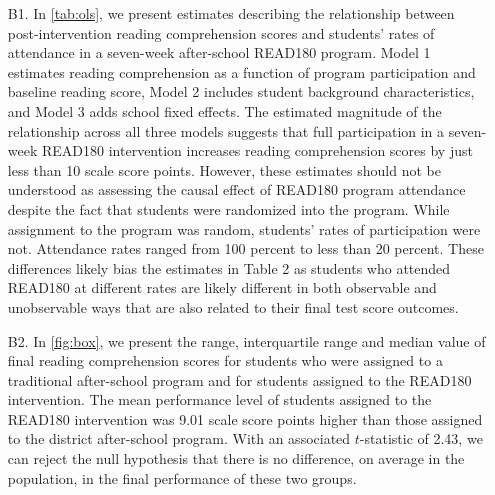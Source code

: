 \documentclass[a4paper, 11pt]{article}
\begin{document}
\begin{enumerate}
	\item[B1.] In \autoref{tab:ols}, we present estimates describing the relationship between post-intervention reading comprehension scores and students' rates of attendance in a seven-week after-school READ180 program. Model 1 estimates reading comprehension as a function of program participation and baseline reading score, Model 2 includes student background characteristics, and Model 3 adds school fixed effects. The estimated magnitude of the relationship across all three models suggests that full participation in a seven-week READ180 intervention increases reading comprehension scores by just less than 10 scale score points. However, these estimates should not be understood as assessing the causal effect of READ180 program attendance despite the fact that students were randomized into the program. While assignment to the program was random, students' rates of participation were not. Attendance rates ranged from 100 percent to less than 20 percent. These differences likely bias the estimates in Table 2 as students who attended READ180 at different rates are likely different in both observable and unobservable ways that are also related to their final test score outcomes.

	

	\item[B2.] In \autoref{fig:box}, we present the range, interquartile range and median value of final reading comprehension scores for students who were assigned to a traditional after-school program and for students assigned to the READ180 intervention. The mean performance level of students assigned to the READ180 intervention was 9.01 scale score points higher than those assigned to the district after-school program. With an associated $t$-statistic of 2.43, we can reject the null hypothesis that there is no difference, on average in the population, in the final performance of these two groups.


\end{enumerate}
\end{document}
